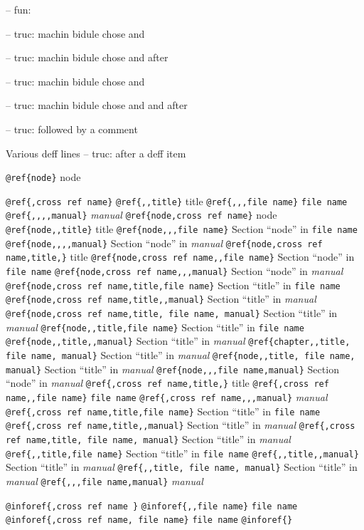 \documentclass{book}
\makeatletter
\renewcommand\mainmatter{\clearpage\@mainmattertrue\pagenumbering{arabic}}
\newcommand\GNUTexinfomainmatter{\mainmatter}
\newcommand{\GNUTexinfosetsingleheader}{\pagestyle{fancy}
\fancyhf{}
\lhead{\nouppercase{\leftmark}}
\rhead{\thepage}
}
\makeatother
\begin{document}
\begin{titlepage}
\hbox{}-- fun: 


\hbox{}-- truc: machin bidule chose and


%
\hbox{}-- truc: machin bidule chose and  after


%
\hbox{}-- truc: machin bidule chose and 


%
\hbox{}-- truc: machin bidule chose and and after


%
\hbox{}-- truc: followed by a comment


%
Various deff lines
\hbox{}-- truc: after a deff item


%

\texttt{@ref\{node\}} node

\texttt{@ref\{,cross ref name\}} 
\texttt{@ref\{,,title\}} title
\texttt{@ref\{,,,file name\}} \texttt{file name}
\texttt{@ref\{,,,,manual\}} \textit{manual}
\texttt{@ref\{node,cross ref name\}} node
\texttt{@ref\{node,,title\}} title
\texttt{@ref\{node,,,file name\}} Section ``node'' in \texttt{file name}
\texttt{@ref\{node,,,,manual\}} Section ``node'' in \textit{manual}
\texttt{@ref\{node,cross ref name,title,\}} title
\texttt{@ref\{node,cross ref name,,file name\}} Section ``node'' in \texttt{file name}
\texttt{@ref\{node,cross ref name,,,manual\}} Section ``node'' in \textit{manual}
\texttt{@ref\{node,cross ref name,title,file name\}} Section ``title'' in \texttt{file name}
\texttt{@ref\{node,cross ref name,title,,manual\}} Section ``title'' in \textit{manual}
\texttt{@ref\{node,cross ref name,title, file name, manual\}} Section ``title'' in \textit{manual}
\texttt{@ref\{node,,title,file name\}} Section ``title'' in \texttt{file name}
\texttt{@ref\{node,,title,,manual\}} Section ``title'' in \textit{manual}
\texttt{@ref\{chapter,,title, file name, manual\}} Section ``title'' in \textit{manual}
\texttt{@ref\{node,,title, file name, manual\}} Section ``title'' in \textit{manual}
\texttt{@ref\{node,,,file name,manual\}} Section ``node'' in \textit{manual}
\texttt{@ref\{,cross ref name,title,\}} title
\texttt{@ref\{,cross ref name,,file name\}} \texttt{file name}
\texttt{@ref\{,cross ref name,,,manual\}} \textit{manual}
\texttt{@ref\{,cross ref name,title,file name\}} Section ``title'' in \texttt{file name}
\texttt{@ref\{,cross ref name,title,,manual\}} Section ``title'' in \textit{manual}
\texttt{@ref\{,cross ref name,title, file name, manual\}} Section ``title'' in \textit{manual}
\texttt{@ref\{,,title,file name\}} Section ``title'' in \texttt{file name}
\texttt{@ref\{,,title,,manual\}} Section ``title'' in \textit{manual}
\texttt{@ref\{,,title, file name, manual\}} Section ``title'' in \textit{manual}
\texttt{@ref\{,,,file name,manual\}} \textit{manual}

\texttt{@inforef\{,cross ref name \}} 
\texttt{@inforef\{,,file name\}} \texttt{file name}
\texttt{@inforef\{,cross ref name, file name\}} \texttt{file name}
\texttt{@inforef\{\}} 


\endgroup
\end{titlepage}
\GNUTexinfosetsingleheader{}%
\GNUTexinfomainmatter
\end{document}
